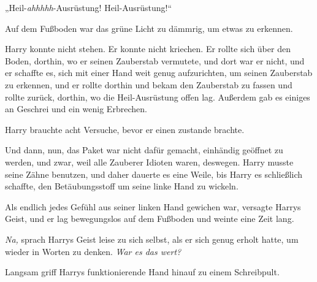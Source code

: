 „Heil-\emph{ahhhhh}-Ausrüstung! Heil-Ausrüstung!“

Auf dem Fußboden war das grüne Licht zu dämmrig, um etwas zu erkennen.

Harry konnte nicht stehen. Er konnte nicht kriechen. Er rollte sich über den Boden, dorthin, wo er seinen Zauberstab vermutete, und dort war er nicht, und er schaffte es, sich mit einer Hand weit genug aufzurichten, um seinen Zauberstab zu erkennen, und er rollte dorthin und bekam den Zauberstab zu fassen und rollte zurück, dorthin, wo die Heil-Ausrüstung offen lag. Außerdem gab es einiges an Geschrei und ein wenig Erbrechen.

Harry brauchte acht Versuche, bevor er einen  zustande brachte.

Und dann, nun, das Paket war nicht dafür gemacht, einhändig geöffnet zu werden, und zwar, weil alle Zauberer Idioten waren, deswegen. Harry musste seine Zähne benutzen, und daher dauerte es eine Weile, bis Harry es schließlich schaffte, den Betäubungsstoff um seine linke Hand zu wickeln.

Als endlich jedes Gefühl aus seiner linken Hand gewichen war, versagte Harrys Geist, und er lag bewegungslos auf dem Fußboden und weinte eine Zeit lang.

\emph{Na,} sprach Harrys Geist leise zu sich selbst, als er sich genug erholt hatte, um wieder in Worten zu denken. \emph{War es das wert?}

Langsam griff Harrys funktionierende Hand hinauf zu einem Schreibpult.

